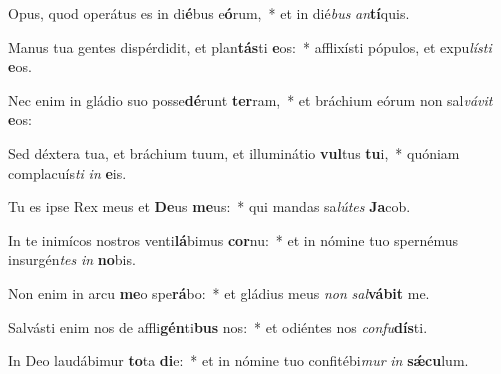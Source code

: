 \item Opus, quod operátus es in di\textbf{é}bus e\textbf{ó}rum,~* et in dié\textit{bus} \textit{an}\textbf{tí}quis.
\item Manus tua gentes dispérdidit, et plan\textbf{tás}ti \textbf{e}os:~* afflixísti pópulos, et expu\textit{lís}\textit{ti} \textbf{e}os.
\item Nec enim in gládio suo posse\textbf{dé}runt \textbf{ter}ram,~* et bráchium eórum non sal\textit{vá}\textit{vit} \textbf{e}os:
\item Sed déxtera tua, et bráchium tuum, et illuminátio \textbf{vul}tus \textbf{tu}i,~* quóniam complacuís\textit{ti} \textit{in} \textbf{e}is.
\item Tu es ipse Rex meus et \textbf{De}us \textbf{me}us:~* qui mandas sa\textit{lú}\textit{tes} \textbf{Ja}cob.
\item In te inimícos nostros venti\textbf{lá}bimus \textbf{cor}nu:~* et in nómine tuo spernémus insurgén\textit{tes} \textit{in} \textbf{no}bis.
\item Non enim in arcu \textbf{me}o spe\textbf{rá}bo:~* et gládius meus \textit{non} \textit{sal}\textbf{vá}\textbf{bit} me.
\item Salvásti enim nos de affli\textbf{gén}ti\textbf{bus} nos:~* et odiéntes nos \textit{con}\textit{fu}\textbf{dís}ti.
\item In Deo laudábimur \textbf{to}ta \textbf{di}e:~* et in nómine tuo confitébi\textit{mur} \textit{in} \textbf{sǽ}\textbf{cu}lum.
